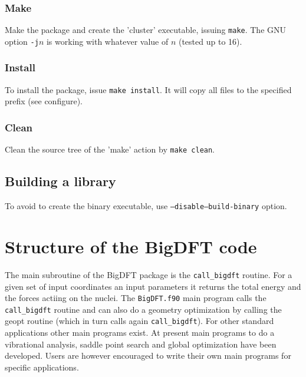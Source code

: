 \documentclass[a4paper,11pt]{report}
\begin{document}
\subsection{Make}
Make the package and create the 'cluster' executable, issuing \texttt{make}. The GNU option \texttt{-j$n$} is working with whatever value of $n$ (tested up to 16).

\subsection{Install}
To install the package, issue \texttt{make install}. It will copy all files to the specified prefix (see configure).

\subsection{Clean}
Clean the source tree of the 'make' action by \texttt{make clean}.

\section{Building a library}
To avoid to create the binary executable,
use \texttt{--disable--build-binary} option.

\chapter{Structure of the BigDFT code}
\noindent
The main subroutine of the BigDFT package is the \texttt{call\_bigdft} routine. For a given set of input coordinates 
an input parameters it returns the total energy and the forces actiing on the nuclei. The \texttt{BigDFT.f90} main program 
calls the \texttt{call\_bigdft} routine and can also do a geometry optimization by calling the geopt routine (which in turn calls 
again \texttt{call\_bigdft}). For other standard applications other main programs exist.
At present main programs to do a vibrational analysis, saddle point search and global optimization have been developed.
Users are however encouraged to write their own main programs for specific applications. 
\end{document}
